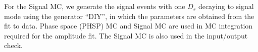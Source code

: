 

For the Signal MC, we generate the signal events with one $D_{s}$ decaying to signal mode using the generator ``DIY'', in which the parameters are obtained from the fit to data. Phase space (PHSP) MC and Signal MC are used in MC integration required for the amplitude fit. The Signal MC is also used in the input/output check.



